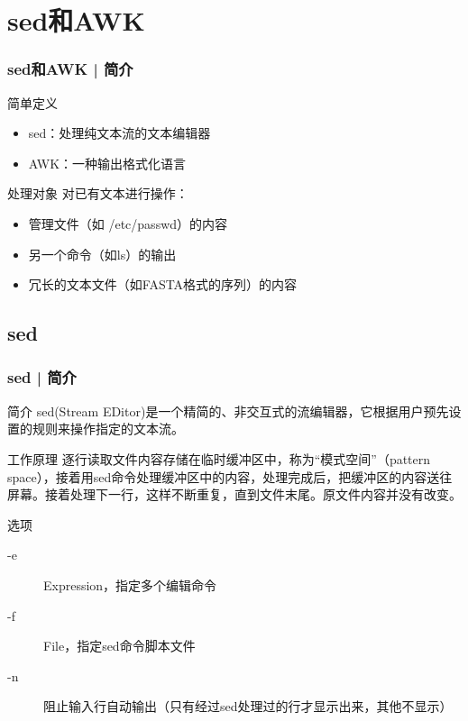 \section{sed和AWK}
\begin{frame}
  \frametitle{sed和AWK | 简介}
  \begin{block}{简单定义}
    \begin{itemize}
      \item sed：处理纯文本流的文本编辑器
      \item AWK：一种输出格式化语言
    \end{itemize}
  \end{block}
  \pause
  \begin{block}{处理对象}
    对已有文本进行操作：
    \begin{itemize}
      \item 管理文件（如 /etc/passwd）的内容
      \item 另一个命令（如ls）的输出
      \item 冗长的文本文件（如FASTA格式的序列）的内容
    \end{itemize}
  \end{block}
\end{frame}

\subsection{sed}
\begin{frame}
  \frametitle{sed | 简介}
  \begin{block}{简介}
    sed(Stream EDitor)是一个精简的、非交互式的流编辑器，它根据用户预先设置的规则来操作指定的文本流。
  \end{block}
  \pause
  \begin{block}{工作原理}
    逐行读取文件内容存储在临时缓冲区中，称为“模式空间”（pattern space），接着用sed命令处理缓冲区中的内容，处理完成后，把缓冲区的内容送往屏幕。接着处理下一行，这样不断重复，直到文件末尾。原文件内容并没有改变。
  \end{block}
  \pause
  \begin{block}{\alert{选项}}
    \begin{description}
      \item[-e] Expression，指定多个编辑命令
      \item[-f] File，指定sed命令脚本文件
      \item[-n] 阻止输入行自动输出（只有经过sed处理过的行才显示出来，其他不显示）
    \end{description}
  \end{block}
\end{frame}

